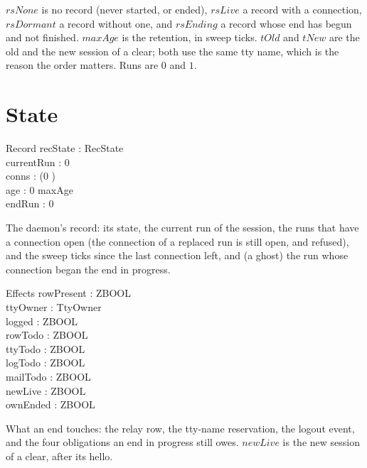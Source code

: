 \documentclass[a4paper,10pt,fleqn]{article}
\begin{document}
$rsNone$ is no record (never started, or ended), $rsLive$ a record with a
connection, $rsDormant$ a record without one, and $rsEnding$ a record whose end
has begun and not finished.  $maxAge$ is the retention, in sweep ticks.
$tOld$ and $tNew$ are the old and the new session of a clear; both use the same
tty name, which is the reason the order matters.  Runs are $0$ and $1$.

\section{State}

\begin{schema}{Record}
  recState : RecState \\
  currentRun : 0  \\
  conns : \power (0 ) \\
  age : 0 \upto maxAge \\
  endRun : 0 
\end{schema}

The daemon's record: its state, the current run of the session, the runs that
have a connection open (the connection of a replaced run is still open, and
refused), and the sweep ticks since the last connection left, and (a ghost) the run whose
connection began the end in progress.

\begin{schema}{Effects}
  rowPresent : ZBOOL \\
  ttyOwner : TtyOwner \\
  logged : ZBOOL \\
  rowTodo : ZBOOL \\
  ttyTodo : ZBOOL \\
  logTodo : ZBOOL \\
  mailTodo : ZBOOL \\
  newLive : ZBOOL \\
  ownEnded : ZBOOL
\end{schema}

What an end touches: the relay row, the tty-name reservation, the logout event,
and the four obligations an end in progress still owes.  $newLive$ is the new
session of a clear, after its hello.
\end{document}
